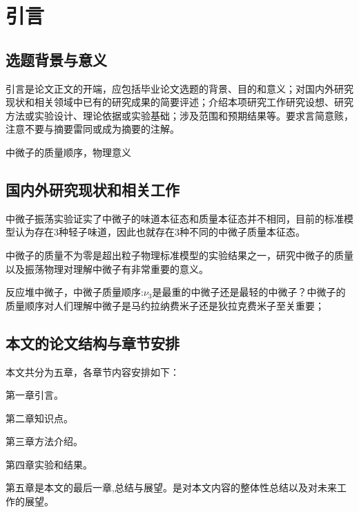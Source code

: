 
\chapter{引言}
\label{cha:introduction}
\section{选题背景与意义}
\label{sec:background}
引言是论文正文的开端，应包括毕业论文选题的背景、目的和意义；对国内外研究现状和相关领域中已有的研究成果的简要评述；介绍本项研究工作研究设想、研究方法或实验设计、理论依据或实验基础；涉及范围和预期结果等。要求言简意赅，注意不要与摘要雷同或成为摘要的注解。

中微子的质量顺序，物理意义
\section{国内外研究现状和相关工作}
\label{sec:related_work}
中微子振荡实验证实了中微子的味道本征态和质量本征态并不相同，目前的标准模型认为存在3种轻子味道，因此也就存在3种不同的中微子质量本征态。

中微子的质量不为零是超出粒子物理标准模型的实验结果之一，研究中微子的质量以及振荡物理对理解中微子有非常重要的意义。

反应堆中微子，中微子质量顺序:$\nu_{3}$是最重的中微子还是最轻的中微子？中微子的质量顺序对人们理解中微子是马约拉纳费米子还是狄拉克费米子至关重要；

\section{本文的论文结构与章节安排}

\label{sec:arrangement}
本文共分为五章，各章节内容安排如下：

第一章引言。

第二章知识点。

第三章方法介绍。

第四章实验和结果。

第五章是本文的最后一章,总结与展望。是对本文内容的整体性总结以及对未来工作的展望。

















